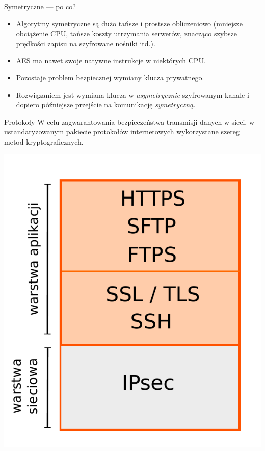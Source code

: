 \begin{frame}{Symetryczne --- po co?}
	\begin{itemize}
		\item Algorytmy symetryczne są dużo tańsze i prostsze obliczeniowo (mniejsze obciążenie CPU, tańsze koszty utrzymania serwerów, znacząco szybsze prędkości zapisu na szyfrowane nośniki itd.).
		\item AES ma nawet swoje natywne instrukcje w niektórych CPU.
		\item Pozostaje problem bezpiecznej wymiany klucza prywatnego.
		\item Rozwiązaniem jest wymiana klucza w \emph{asymetrycznie} szyfrowanym kanale i dopiero późniejsze przejście na komunikację \emph{symetryczną}.
	\end{itemize}
\end{frame}

\begin{frame}{Protokoły}
	W celu zagwarantowania bezpieczeństwa transmisji danych w sieci, w ustandaryzowanym pakiecie protokołów internetowych wykorzystane szereg metod kryptograficznych.
	\begin{center}
		\includegraphics[height=0.4\paperwidth]{images/protocols.pdf}	
	\end{center}

\end{frame}

